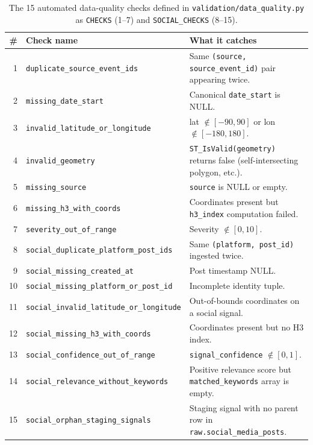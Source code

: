\documentclass[11pt,a4paper]{article}
\begin{document}
\begin{table}[h!]
\centering
\small
\begin{tabular}{@{}rlp{8cm}@{}}
\toprule
\textbf{\#} & \textbf{Check name} & \textbf{What it catches} \\
\midrule
1  & \texttt{duplicate\_source\_event\_ids}       & Same \texttt{(source, source\_event\_id)} pair appearing twice. \\
2  & \texttt{missing\_date\_start}                 & Canonical \texttt{date\_start} is NULL. \\
3  & \texttt{invalid\_latitude\_or\_longitude}     & lat $\notin [-90,90]$ or lon $\notin [-180,180]$. \\
4  & \texttt{invalid\_geometry}                    & \texttt{ST\_IsValid(geometry)} returns false (self-intersecting polygon, etc.). \\
5  & \texttt{missing\_source}                      & \texttt{source} is NULL or empty. \\
6  & \texttt{missing\_h3\_with\_coords}            & Coordinates present but \texttt{h3\_index} computation failed. \\
7  & \texttt{severity\_out\_of\_range}             & Severity $\notin [0, 10]$. \\
\midrule
8  & \texttt{social\_duplicate\_platform\_post\_ids} & Same \texttt{(platform, post\_id)} ingested twice. \\
9  & \texttt{social\_missing\_created\_at}         & Post timestamp NULL. \\
10 & \texttt{social\_missing\_platform\_or\_post\_id} & Incomplete identity tuple. \\
11 & \texttt{social\_invalid\_latitude\_or\_longitude} & Out-of-bounds coordinates on a social signal. \\
12 & \texttt{social\_missing\_h3\_with\_coords}    & Coordinates present but no H3 index. \\
13 & \texttt{social\_confidence\_out\_of\_range}   & \texttt{signal\_confidence} $\notin [0, 1]$. \\
14 & \texttt{social\_relevance\_without\_keywords} & Positive relevance score but \texttt{matched\_keywords} array is empty. \\
15 & \texttt{social\_orphan\_staging\_signals}     & Staging signal with no parent row in \texttt{raw.social\_media\_posts}. \\
\bottomrule
\end{tabular}
\caption{The 15 automated data-quality checks defined in
\texttt{validation/data\_quality.py} as \texttt{CHECKS} (1--7) and
\texttt{SOCIAL\_CHECKS} (8--15).}
\label{tab:dq}
\end{table}
\end{document}
